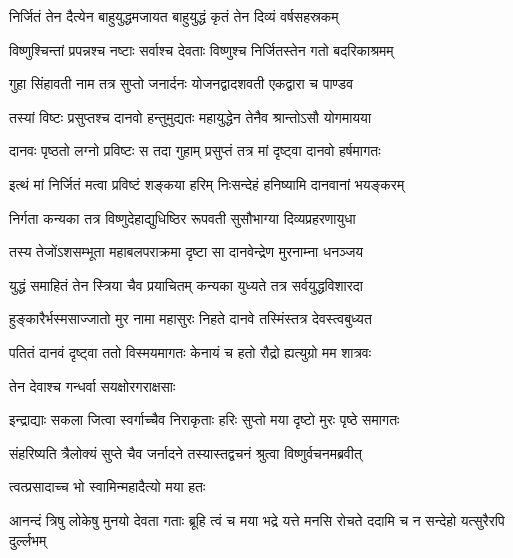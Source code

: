 \twolineshloka
{निर्जितं तेन दैत्येन बाहुयुद्धमजायत}
{बाहुयुद्धं कृतं तेन दिव्यं वर्षसहस्रकम्}%

\twolineshloka
{विष्णुश्चिन्तां प्रपन्नश्च नष्टाः सर्वाश्च देवताः}
{विष्णुश्च निर्जितस्तेन गतो बदरिकाश्रमम्}%

\twolineshloka
{गुहा सिंहावती नाम तत्र सुप्तो जनार्दनः}
{योजनद्वादशवती एकद्वारा च पाण्डव}%

\twolineshloka
{तस्यां विष्टः प्रसुप्तश्च दानवो हन्तुमुद्यतः}
{महायुद्धेन तेनैव श्रान्तोऽसौ योगमायया}%

\twolineshloka
{दानवः पृष्ठतो लग्नो प्रविष्टः स तदा गुहाम्}
{प्रसुप्तं तत्र मां दृष्ट्वा दानवो हर्षमागतः}%

\twolineshloka
{इत्थं मां निर्जितं मत्वा प्रविष्टं शङ्कया हरिम्}
{निःसन्देहं हनिष्यामि दानवानां भयङ्करम्}%

\twolineshloka
{निर्गता कन्यका तत्र विष्णुदेहाद्युधिष्ठिर}
{रूपवती सुसौभाग्या दिव्यप्रहरणायुधा}%

\twolineshloka
{तस्य तेजोंऽशसम्भूता महाबलपराक्रमा}
{दृष्टा सा दानवेन्द्रेण मुरनाम्ना धनञ्जय}%

\twolineshloka
{युद्धं समाहितं तेन स्त्रिया चैव प्रयाचितम्}
{कन्यका युध्यते तत्र सर्वयुद्धविशारदा}%

\twolineshloka
{हुङ्कारैर्भस्मसाज्जातो मुर नामा महासुरः}
{निहते दानवे तस्मिंस्तत्र देवस्त्वबुध्यत}%

\twolineshloka
{पतितं दानवं दृष्ट्वा ततो विस्मयमागतः}
{केनायं च हतो रौद्रो ह्यत्युग्रो मम शात्रवः}%


\onelineshloka
{तेन देवाश्च गन्धर्वा सयक्षोरगराक्षसाः}%

\twolineshloka
{इन्द्राद्याः सकला जित्वा स्वर्गाच्चैव निराकृताः}
{हरिः सुप्तो मया दृष्टो मुरः पृष्ठे समागतः}%

\twolineshloka
{संहरिष्यति त्रैलोक्यं सुप्ते चैव जर्नादने}
{तस्यास्तद्वचनं श्रुत्वा विष्णुर्वचनमब्रवीत्}%

\onelineshloka
{त्वत्प्रसादाच्च भो स्वामिन्महादैत्यो मया हतः}%


\threelineshloka
{आनन्दं त्रिषु लोकेषु मुनयो देवता गताः}
{ब्रूहि त्वं च मया भद्रे यत्ते मनसि रोचते}
{ददामि च न सन्देहो यत्सुरैरपि दुर्ल्लभम्}%


